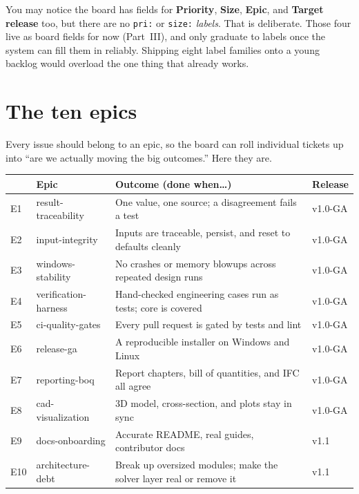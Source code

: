 \documentclass[11pt,a4paper]{report}
\newcommand{\code}[1]{\texttt{#1}}
\begin{document}
\begin{notebox}
You may notice the board has fields for \textbf{Priority}, \textbf{Size},
\textbf{Epic}, and \textbf{Target release} too, but there are no \code{pri:} or
\code{size:} \emph{labels}. That is deliberate. Those four live as board fields for
now (Part~III), and only graduate to labels once the system can fill them in
reliably. Shipping eight label families onto a young backlog would overload the one
thing that already works.
\end{notebox}

\chapter{The ten epics}

Every issue should belong to an epic, so the board can roll individual tickets up
into ``are we actually moving the big outcomes.'' Here they are.

\begin{center}
\begin{longtable}{@{}p{0.5cm}p{3.4cm}p{7.0cm}p{1.8cm}@{}}
\toprule
\textbf{} & \textbf{Epic} & \textbf{Outcome (done when\ldots)} & \textbf{Release} \\
\midrule
\endhead
E1 & result-traceability & One value, one source; a disagreement fails a test & v1.0-GA \\
E2 & input-integrity & Inputs are traceable, persist, and reset to defaults cleanly & v1.0-GA \\
E3 & windows-stability & No crashes or memory blowups across repeated design runs & v1.0-GA \\
E4 & verification-harness & Hand-checked engineering cases run as tests; core is covered & v1.0-GA \\
E5 & ci-quality-gates & Every pull request is gated by tests and lint & v1.0-GA \\
E6 & release-ga & A reproducible installer on Windows and Linux & v1.0-GA \\
E7 & reporting-boq & Report chapters, bill of quantities, and IFC all agree & v1.0-GA \\
E8 & cad-visualization & 3D model, cross-section, and plots stay in sync & v1.0-GA \\
E9 & docs-onboarding & Accurate README, real guides, contributor docs & v1.1 \\
E10 & architecture-debt & Break up oversized modules; make the solver layer real or remove it & v1.1 \\
\bottomrule
\end{longtable}
\end{center}
\end{document}
